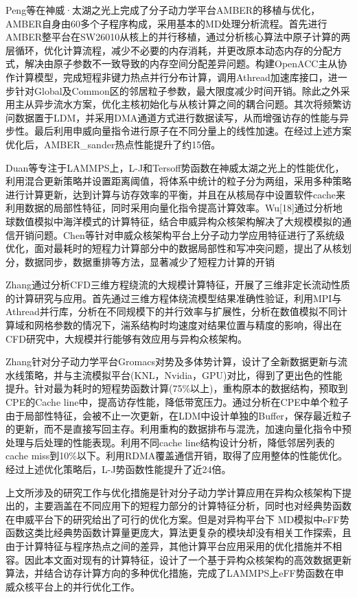 Peng\cite{peng2020}等在神威·太湖之光上完成了分子动力学平台AMBER的移植与优化，AMBER自身由60多个子程序构成，采用基本的MD处理分析流程。首先进行AMBER整平台在SW26010从核上的并行移植，通过分析核心算法中原子计算的两层循环，优化计算流程，减少不必要的内存消耗，并更改原本动态内存的分配方式，解决由原子参数不一致导致的内存空间分配差异问题。构建OpenACC主从协作计算模型，完成短程非键力热点并行分布计算，调用Athread加速库接口，进一步针对Global及Common区的邻居粒子参数，最大限度减少时间开销。除此之外采用主从异步流水方案，优化主核初始化与从核计算之间的耦合问题。其次将频繁访问数据置于LDM，并采用DMA通道方式进行数据读写，从而增强访存的性能与异步性。最后利用申威向量指令进行原子在不同分量上的线性加速。在经过上述方案优化后，AMBER\_sander热点性能提升了约15倍。

Duan\cite{duan2018redesigning}等专注于LAMMPS上，L-J和Tersoff势函数在神威太湖之光上的性能优化，利用混合更新策略并设置距离阈值，将体系中统计的粒子分为两组，采用多种策略进行计算更新，达到计算与访存效率的平衡，并且在从核局存中设置软件cache来利用数据的局部性特征，同时采用向量化指令提高计算效率。Wu[18]通过分析地球数值模拟中海洋模式的计算特征，结合申威异构众核架构解决了大规模模拟的通信开销问题。Chen\cite{chen2021towards}等针对申威众核架构平台上分子动力学应用特征进行了系统级优化，面对最耗时的短程力计算部分中的数据局部性和写冲突问题，提出了从核划分，数据同步，数据重排等方法，显著减少了短程力计算的开销

Zhang\cite{zyy2022}通过分析CFD三维方程绕流的大规模计算特征，开展了三维非定长流动性质的计算研究与应用。首先通过三维方程体绕流模型结果准确性验证，利用MPI与Athread并行库，分析在不同规模下的并行效率与扩展性，分析在数值模拟不同计算域和网格参数的情况下，湍系结构时均速度对结果位置与精度的影响，得出在CFD研究中，大规模并行能够有效应用与异构众核架构。

Zhang\cite{zhang2019sw_gromacs}针对分子动力学平台Gromacs对势及多体势计算，设计了全新数据更新与流水线策略，并与主流模拟平台(KNL，Nvidia，GPU)对比，得到了更出色的性能提升。针对最为耗时的短程势函数计算(75\%以上)，重构原本的数据结构，预取到CPE的Cache line中，提高访存性能，降低带宽压力。通过分析在CPE中单个粒子由于局部性特征，会被不止一次更新，在LDM中设计单独的Buffer，保存最近粒子的更新，而不是直接写回主存。利用重构的数据排布与混洗，加速向量化指令中预处理与后处理的性能表现。利用不同cache line结构设计分析，降低邻居列表的cache miss到10\%以下。利用RDMA\cite{zhu2015congestion}覆盖通信开销，取得了应用整体的性能优化。经过上述优化策略后，L-J势函数性能提升了近24倍。

上文所涉及的研究工作与优化措施是针对分子动力学计算应用在异构众核架构下提出的，主要涵盖在不同应用下的短程力部分的计算特征分析，同时也对经典势函数在申威平台下的研究给出了可行的优化方案。但是对异构平台下 MD模拟中eFF势函数这类比经典势函数计算量更庞大，算法更复杂的模块却没有相关工作探索，且由于计算特征与程序热点之间的差异，其他计算平台应用采用的优化措施并不相容。因此本文面对现有的计算特征，设计了一个基于异构众核架构的高效数据更新算法，并结合访存计算方向的多种优化措施，完成了LAMMPS上eFF势函数在申威众核平台上的并行优化工作。

